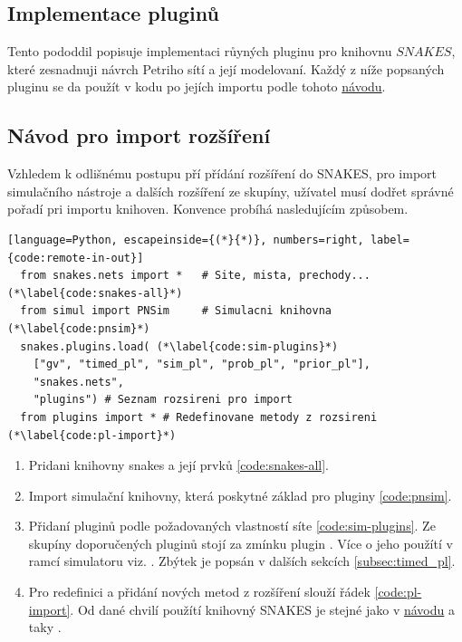 \subsection{Implementace pluginů}
\label{sec:plug-impl}
Tento pododdil popisuje implementaci růyných pluginu pro knihovnu $SNAKES$, které zesnadnuji návrch Petriho sítí a její modelovaní. Každý z níže popsaných pluginu se da  použít v kodu po jejích importu podle tohoto \href{https://www.ibisc.univ-evry.fr/~fpommereau/SNAKES/first-steps-with-snakes.html}{návodu}.

\subsection{Návod pro import rozšíření}
Vzhledem k odlišnému postupu pří přídání rozšíření do SNAKES, pro import simulačního nástroje a dalších rozšíření ze skupíny, užívatel musí dodřet správné pořadí pri importu knihoven. Konvence probíhá nasledujícím způsobem.

\begin{lstlisting}[language=Python, escapeinside={(*}{*)}, numbers=right, label={code:remote-in-out}]
  from snakes.nets import *   # Site, mista, prechody... (*\label{code:snakes-all}*)
  from simul import PNSim     # Simulacni knihovna (*\label{code:pnsim}*)
  snakes.plugins.load( (*\label{code:sim-plugins}*)
    ["gv", "timed_pl", "sim_pl", "prob_pl", "prior_pl"],
    "snakes.nets",
    "plugins") # Seznam rozsireni pro import
  from plugins import * # Redefinovane metody z rozsireni (*\label{code:pl-import}*)
\end{lstlisting}

\begin{enumerate}
  \item Pridani knihovny snakes a její prvků \ref{code:snakes-all}.
  \item Import simulační knihovny, která poskytné základ pro pluginy \ref{code:pnsim}.
  \item Přidaní pluginů podle požadovaných vlastností síte \ref{code:sim-plugins}. Ze skupíny doporučených pluginů stojí za zmínku plugin \href{https://www.ibisc.univ-evry.fr/~fpommereau/SNAKES/API/plugins/gv.html}{}. Více o jeho použítí v ramcí simulatoru viz. \todo{}. Zbýtek je popsán v dalších sekcích \ref{subsec:timed_pl}.
  \item Pro redefinici a přidání nových metod z rozšíření slouží řádek \ref{code:pl-import}. Od dané chvilí použítí knihovný SNAKES je stejné jako v \href{https://www.ibisc.univ-evry.fr/~fpommereau/SNAKES/first-steps-with-snakes.html}{návodu} a taky .
\end{enumerate}


